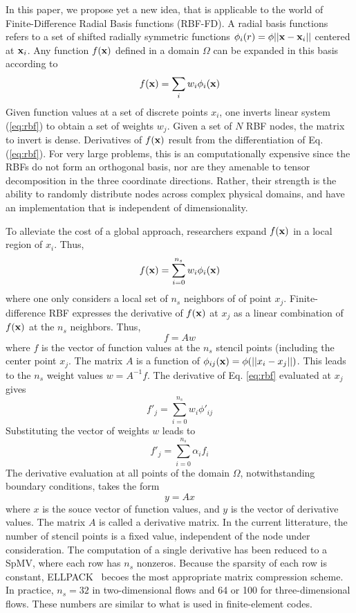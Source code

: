 \documentclass[10pt, conference, compsocconf]{IEEEtran}
\begin{document}

In this paper, we propose yet a new idea, that is applicable to the
world of Finite-Difference Radial Basis functions (RBF-FD). A radial
basis functions refers to a set of shifted radially symmetric
functions $\phi_i(r) =\phi{||{\bf x}-{\bf x}_i||}$ centered at
${\bf x}_i$\cite{}. Any function $f({\bf x})$ defined in a domain $\Omega$
can be expanded in this basis according to
\begin{equation}
f(\xvec) =  \sum_i w_i \phi_i(\xvec) \label{eq:rbf}
\end{equation}
Given function values at a set of discrete points $x_i$, one inverts
linear system (\ref{eq:rbf}) to obtain a set of weights $w_j$. Given a
set of $N$ RBF nodes, the matrix to invert is dense. Derivatives of
$f({\bf x})$ result from the differentiation of Eq. (\ref{eq:rbf}). For
very large problems, this is an computationally expensive since the
RBFs do not form an orthogonal basis, nor are they amenable to tensor
decomposition in the three coordinate directions. Rather, their
strength is the ability to randomly distribute nodes across complex
physical domains, and have an implementation that is independent of
dimensionality.

To alleviate the cost of a global approach, researchers \cite{} expand
$f({\bf x})$ in a local region of $x_i$. Thus,
$$
f(\xvec) =  \sum_{i=0}^{n_s} w_i \phi_i(\xvec) \label{eq:rbf}
$$
where one only considers a local set of $n_s$ neighbors of of point $x_j$. 
Finite-difference RBF expresses the derivative of $f({\bf x})$ at $x_j$ as a linear
combination of $f({\bf x})$ at the $n_s$ neighbors. Thus, 
$$
f = A w
$$ where $f$ is the vector of function values at the $n_s$ stencil
points (including the center point $x_j$. The matrix $A$ is a function
of $\phi_{ij}({\bf x}) =\phi(||x_i-x_j||)$. This leads to the $n_s$
weight values $w = A^{-1} f$. The derivative of Eq. \ref{eq:rbf}
evaluated at $x_j$ gives
$$
   f'_j = \sum_{i=0}^{n_s} w_i \phi'_{ij}
$$
Substituting the vector of weights $w$ leads to 
$$
  f'_j = \sum_{i=0}^{n_s} \alpha_i f_i
$$
The derivative evaluation at all points of the domain $\Omega$, notwithstanding boundary conditions, takes the form
$$
  y = A x
$$ 
where $x$ is the souce vector of function values, and $y$ is the
vector of derivative values. The matrix $A$ is called a derivative
matrix. In the current litterature, the number of stencil points is a
fixed value, independent of the node under consideration\cite{}. The
computation of a single derivative has been reduced to a SpMV, where
each row has $n_s$ nonzeros. Because the sparsity of each row is
constant, ELLPACK~\cite{} becoes the most appropriate matrix
compression scheme\cite{}. In practice, $n_s=32$ in two-dimensional
flows and 64 or 100 for three-dimensional flows. These numbers are
similar to what is used in finite-element codes.
\end{document}
